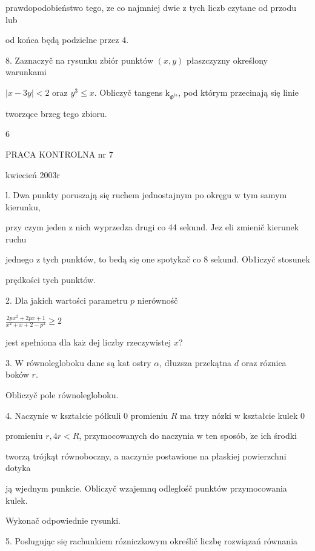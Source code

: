 \documentclass[a4paper,12pt]{article}
\begin{document}
prawdopodobieństwo tego, $\dot{\mathrm{z}}\mathrm{e}$ co najmniej dwie $\mathrm{z}$ tych liczb czytane od przodu lub

od końca będą podzielne przez 4.

8. Zaznaczyč na rysunku zbiór punktów $(x,y)$ płaszczyzny określony warunkami

$|x-3y| <2$ oraz $y^{3}\leq x$. Obliczyč tangens $\mathrm{k}_{\Phi^{\mathrm{t}\mathrm{a}}}$, pod którym przecinają się linie

tworzqce brzeg tego zbioru.

6





PRACA KONTROLNA nr 7

kwiecień 2003r

l. Dwa punkty poruszają się ruchem jednostajnym po okręgu $\mathrm{w}$ tym samym kierunku,

przy czym jeden $\mathrm{z}$ nich wyprzedza drugi co 44 sekund. $\mathrm{J}\mathrm{e}\dot{\mathrm{z}}$ eli zmienič kierunek ruchu

jednego $\mathrm{z}$ tych punktów, to bedą się one spotykač co 8 sekund. Ob1iczyč stosunek

prędkości tych punktów.

2. Dla jakich wartości parametru $p$ nierównośč

$\displaystyle \frac{2px^{2}+2px+1}{x^{2}+x+2-p^{2}}\geq 2$

jest spełniona dla $\mathrm{k}\mathrm{a}\dot{\mathrm{z}}$ dej liczby rzeczywistej $x$?

3. $\mathrm{W}$ równolegloboku dane są $\mathrm{k}\mathrm{a}\mathrm{t}$ ostry $\alpha$, dłuzsza przekątna $d$ oraz róznica boków $r.$

Obliczyč pole równolegloboku.

4. Naczynie $\mathrm{w}$ kształcie półkuli $0$ promieniu $R$ ma trzy nózki $\mathrm{w}$ kształcie kulek $0$

promieniu $r, 4r < R$, przymocowanych do naczynia $\mathrm{w}$ ten sposób, $\dot{\mathrm{z}}\mathrm{e}$ ich środki

tworzą trójkąt równoboczny, a naczynie postawione na płaskiej powierzchni dotyka

ją wjednym punkcie. Obliczyč wzajemnq odleglośč punktów przymocowania kulek.

Wykonač odpowiednie rysunki.

5. Poslugując się rachunkiem rózniczkowym określič liczbę rozwiązań równania
\end{document}
